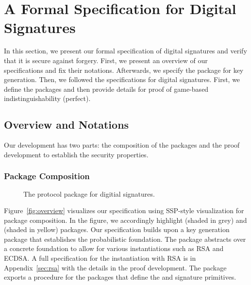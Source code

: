 \section{A Formal Specification for Digital Signatures}
\label{sec:sig}

%
In this section, we present our formal specification of digital
signatures and verify that it is secure against forgery. 
%
First, we present an overview of our specifications and fix their notations.
%
Afterwards, we specify the package for key generation.
%
Then, we followed the specifications for digital signatures. 
%
First, we define the packages and then provide details for proof of 
game-based indistinguishability (perfect).
%

\subsection{Overview and Notations}
%
Our development has two parts: the composition of the packages
and the proof development to establish the security properties.
%

\subsubsection{Package Composition}

\begin{figure*}
	\centering
	
	\caption{
  Our formal specification of remote attestation is based on digital signatures.
  The security reasoning is based on the concept of indistinguishability
  for a game pair \real, which represents the actual code,
  and \ideal, which represents the model, i.e., the semantics
  of the real code
  in the context of indistinguishability proofs.}\label{fig:overview}
\end{figure*}


\begin{figure}
  \centering
  
  \caption{The protocol package for digitial signatures.}
  \label{fig:pprot}
\end{figure}
%
Figure~\ref{fig:overview} visualizes our specification using SSP-style
visualization for package composition.
%
In the figure, we accordingly highlight \real (shaded in grey) and 
\ideal (shaded in yellow) packages.
%
Our specification builds upon a key generation package \pkeygen that
establishes the probabilistic foundation.
%
The package \pkeygen abstracts over a concrete foundation to allow
for various instantiations such as RSA and ECDSA.
%
A full specification for the instantiation with RSA is in Appendix~\ref{sec:rsa}
with the details in the proof development.
%
The package \pkeygen exports a \ekeygen procedure for the packages that
define the \real and \ideal signature
primitives.
%
%
%

